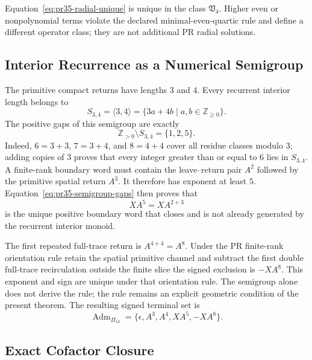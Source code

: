 Equation~\eqref{eq:pr35-radial-unique} is unique in the class
\(\mathfrak V_4\).  Higher even or nonpolynomial terms violate the declared
minimal-even-quartic rule and define a different operator class; they are not
additional PR radial solutions.

\subsection{Interior Recurrence as a Numerical Semigroup}
\label{subsec:pr35-compact-semigroup}

The primitive compact returns have lengths $3$ and $4$.  Every recurrent
interior length belongs to
\begin{equation}
S_{3,4}
=
\langle3,4\rangle
=
\{3a+4b\mid a,b\in\mathbb Z_{\ge0}\}.
\label{eq:pr35-semigroup}
\end{equation}
The positive gaps of this semigroup are exactly
\begin{equation}
\mathbb Z_{>0}\setminus S_{3,4}
=
\{1,2,5\}.
\label{eq:pr35-semigroup-gaps}
\end{equation}
Indeed, $6=3+3$, $7=3+4$, and $8=4+4$ cover all residue classes modulo $3$; adding copies of $3$ proves that every integer greater than or equal to $6$ lies in $S_{3,4}$. A finite-rank boundary word must contain the leave--return pair $A^2$ followed by the primitive spatial return $A^3$.  It therefore has exponent at least $5$.  Equation~\eqref{eq:pr35-semigroup-gaps} then proves that
\begin{equation}
XA^5=XA^{2+3}
\label{eq:pr35-unique-positive-terminal}
\end{equation}
is the unique positive boundary word that closes and is not already generated
by the recurrent interior monoid.

The first repeated full-trace return is $A^{4+4}=A^8$.  Under the PR finite-rank orientation rule retain the spatial primitive channel and subtract the first double full-trace recirculation outside the finite slice the signed exclusion is $-XA^8$.  This exponent and sign are unique under that orientation rule.  The semigroup alone does not derive the rule; the rule remains an explicit geometric condition of the present theorem. The resulting signed terminal set is
\begin{equation}
\boxed{
\operatorname{Adm}_{\Pi_{13}}
=
\{\epsilon,A^3,A^4,XA^5,-XA^8\}.}
\label{eq:pr35-signed-terminal-set}
\end{equation}

\subsection{Exact Cofactor Closure}
\label{subsec:pr35-exact-cofactor}

